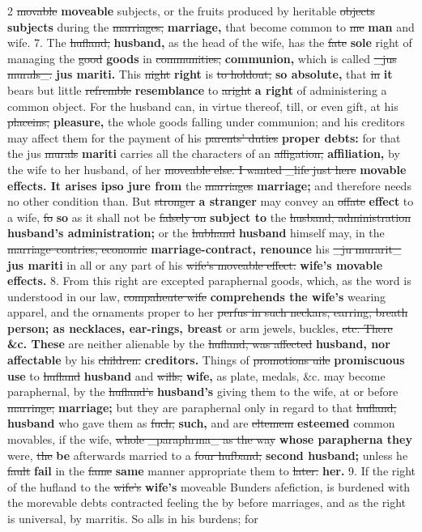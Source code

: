 \documentclass[10pt]{article}
\begin{document}
\begin{multicols}{2}
\sout{movable} \textbf{moveable} subjects, or the fruits produced by heritable \sout{objects} \textbf{subjects} during the \sout{marriages,} \textbf{marriage,} that become common to \sout{me} \textbf{man} and wife. 7. The \sout{hufland,} \textbf{husband,} as the head of the wife, has the \sout{fate} \textbf{sole} right of managing the \sout{good} \textbf{goods} in \sout{communities,} \textbf{communion,} which is called \sout{\_jus murals\_.} \textbf{jus mariti.} This \sout{night} \textbf{right} is \sout{to holdout,} \textbf{so absolute,} that \sout{in} \textbf{it} bears but little \sout{refremble} \textbf{resemblance} to \sout{aright} \textbf{a right} of administering a common object. For the husband can, in virtue thereof, till, or even gift, at his \sout{placeins,} \textbf{pleasure,} the whole goods falling under communion; and his creditors may affect them for the payment of his \sout{parents’ duties} \textbf{proper debts:} for that the jus \sout{murals} \textbf{mariti} carries all the characters of an \sout{affigation,} \textbf{affiliation,} by the wife to her husband, of her \sout{moveable else. I wanted \_life just here} \textbf{movable effects. It arises ipso jure from} the \sout{marriages} \textbf{marriage;} and therefore needs no other condition than. But \sout{stronger} \textbf{a stranger} may convey an \sout{offate} \textbf{effect} to a wife, \sout{fo} \textbf{so} as it shall not be \sout{falsely on} \textbf{subject to} the \sout{husband, administration} \textbf{husband's administration;} or the \sout{hubhand} \textbf{husband} himself may, in the \sout{marriage–contries, economic} \textbf{marriage-contract, renounce} his \sout{\_ju murarit\_} \textbf{jus mariti} in all or any part of his \sout{wife’s moveable effect.} \textbf{wife's movable effects.} 8. From this right are excepted paraphernal goods, which, as the word is understood in our law, \sout{compaheute wife} \textbf{comprehends the wife's} wearing apparel, and the ornaments proper to her \sout{perfus in such neckars, earring, breath} \textbf{person; as necklaces, ear-rings, breast} or arm jewels, buckles, \sout{etc. There} \textbf{\&c. These} are neither alienable by the \sout{hufland, was affected} \textbf{husband, nor affectable} by his \sout{children.} \textbf{creditors.} Things of \sout{promotions uile} \textbf{promiscuous use} to \sout{hufland} \textbf{husband} and \sout{wills,} \textbf{wife,} as plate, medals, \&c. may become paraphernal, by the \sout{hufland's} \textbf{husband's} giving them to the wife, at or before \sout{marringe;} \textbf{marriage;} but they are paraphernal only in regard to that \sout{hufland,} \textbf{husband} who gave them as \sout{fuch,} \textbf{such,} and are \sout{eltemem} \textbf{esteemed} common movables, if the wife, \sout{whole \_paraphrma\_ as the way} \textbf{whose parapherna they} were, \sout{the} \textbf{be} afterwards married to a \sout{four hufband;} \textbf{second husband;} unless he \sout{fault} \textbf{fail} in the \sout{fame} \textbf{same} manner appropriate them to \sout{later.} \textbf{her.} 9. If the right of the hufland to the \sout{wife’s} \textbf{wife's} moveable Bunders afefiction, is burdened with the morevable debts contracted feeling the by before marriages, and as the right is universal, by marritis. So alls in his burdens; for 
\end{multicols}
\end{document}
